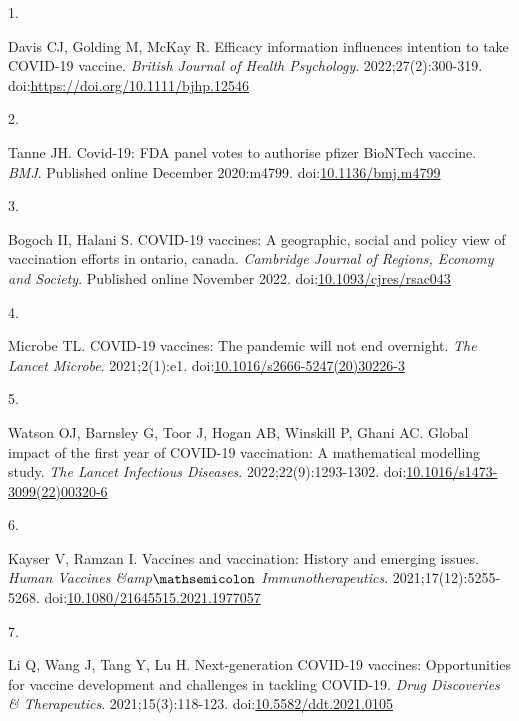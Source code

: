 \documentclass[
  letterpaper,
  DIV=11,
  numbers=noendperiod]{scrartcl}
\newlength{\cslhangindent}
\newlength{\csllabelwidth}
\newlength{\cslentryspacingunit} %
\newenvironment{CSLReferences}[2] %
 {%
  \setlength{\parindent}{0pt}
  \ifodd #1
  \let\oldpar\par
  \def\par{\hangindent=\cslhangindent\oldpar}
  \fi
  \setlength{\parskip}{#2\cslentryspacingunit}
 }%
 {}
\newcommand{\CSLLeftMargin}[1]{\parbox[t]{\csllabelwidth}{#1}}
\newcommand{\CSLRightInline}[1]{\parbox[t]{\linewidth - \csllabelwidth}{#1}\break}
\begin{document}
\hypertarget{refs}{}
\begin{CSLReferences}{0}{0}
\leavevmode{}%
\CSLLeftMargin{1. }%
\CSLRightInline{Davis CJ, Golding M, McKay R. Efficacy information
influences intention to take COVID-19 vaccine. \emph{British Journal of
Health Psychology}. 2022;27(2):300-319.
doi:\url{https://doi.org/10.1111/bjhp.12546}}

\leavevmode{}%
\CSLLeftMargin{2. }%
\CSLRightInline{Tanne JH. Covid-19: {FDA} panel votes to authorise
pfizer {BioNTech} vaccine. \emph{{BMJ}}. Published online December
2020:m4799.
doi:\href{https://doi.org/10.1136/bmj.m4799}{10.1136/bmj.m4799}}

\leavevmode{}%
\CSLLeftMargin{3. }%
\CSLRightInline{Bogoch II, Halani S. {COVID}-19 vaccines: A geographic,
social and policy view of vaccination efforts in ontario, canada.
\emph{Cambridge Journal of Regions, Economy and Society}. Published
online November 2022.
doi:\href{https://doi.org/10.1093/cjres/rsac043}{10.1093/cjres/rsac043}}

\leavevmode{}%
\CSLLeftMargin{4. }%
\CSLRightInline{Microbe TL. {COVID}-19 vaccines: The pandemic will not
end overnight. \emph{The Lancet Microbe}. 2021;2(1):e1.
doi:\href{https://doi.org/10.1016/s2666-5247(20)30226-3}{10.1016/s2666-5247(20)30226-3}}

\leavevmode{}%
\CSLLeftMargin{5. }%
\CSLRightInline{Watson OJ, Barnsley G, Toor J, Hogan AB, Winskill P,
Ghani AC. Global impact of the first year of {COVID}-19 vaccination: A
mathematical modelling study. \emph{The Lancet Infectious Diseases}.
2022;22(9):1293-1302.
doi:\href{https://doi.org/10.1016/s1473-3099(22)00320-6}{10.1016/s1473-3099(22)00320-6}}

\leavevmode{}%
\CSLLeftMargin{6. }%
\CSLRightInline{Kayser V, Ramzan I. Vaccines and vaccination: History
and emerging issues. \emph{Human Vaccines {\&}amp\(\mathsemicolon\)
Immunotherapeutics}. 2021;17(12):5255-5268.
doi:\href{https://doi.org/10.1080/21645515.2021.1977057}{10.1080/21645515.2021.1977057}}

\leavevmode{}%
\CSLLeftMargin{7. }%
\CSLRightInline{Li Q, Wang J, Tang Y, Lu H. Next-generation COVID-19
vaccines: Opportunities for vaccine development and challenges in
tackling COVID-19. \emph{Drug Discoveries \& Therapeutics}.
2021;15(3):118-123.
doi:\href{https://doi.org/10.5582/ddt.2021.0105}{10.5582/ddt.2021.0105}}


\end{CSLReferences}
\end{document}
